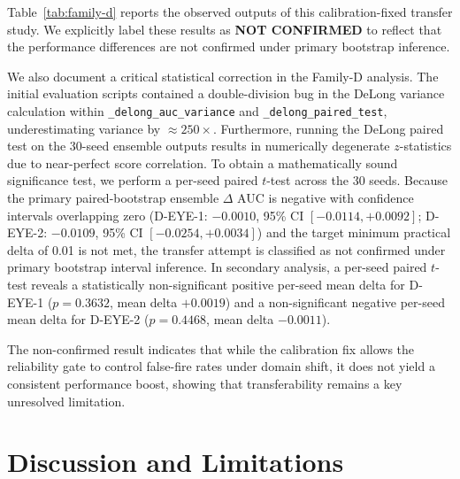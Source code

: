 \documentclass[10pt,conference]{IEEEtran}
\begin{document}
Table~\ref{tab:family-d} reports the observed outputs of this calibration-fixed transfer study. We explicitly label these results as \textbf{NOT CONFIRMED} to reflect that the performance differences are not confirmed under primary bootstrap inference.


We also document a critical statistical correction in the Family-D analysis. The initial evaluation scripts contained a double-division bug in the DeLong variance calculation within \texttt{\_delong\_auc\_variance} and \texttt{\_delong\_paired\_test}, underestimating variance by $\approx 250\times$. Furthermore, running the DeLong paired test on the 30-seed ensemble outputs results in numerically degenerate $z$-statistics due to near-perfect score correlation. To obtain a mathematically sound significance test, we perform a per-seed paired $t$-test across the 30 seeds. Because the primary paired-bootstrap ensemble $\Delta$ AUC is negative with confidence intervals overlapping zero (D-EYE-1: $-0.0010$, 95\% CI $[-0.0114, +0.0092]$; D-EYE-2: $-0.0109$, 95\% CI $[-0.0254, +0.0034]$) and the target minimum practical delta of 0.01 is not met, the transfer attempt is classified as not confirmed under primary bootstrap interval inference. In secondary analysis, a per-seed paired $t$-test reveals a statistically non-significant positive per-seed mean delta for D-EYE-1 ($p = 0.3632$, mean delta $+0.0019$) and a non-significant negative per-seed mean delta for D-EYE-2 ($p = 0.4468$, mean delta $-0.0011$).

The non-confirmed result indicates that while the calibration fix allows the reliability gate to control false-fire rates under domain shift, it does not yield a consistent performance boost, showing that transferability remains a key unresolved limitation.

\section{Discussion and Limitations}
\label{sec:limitations}
\end{document}

